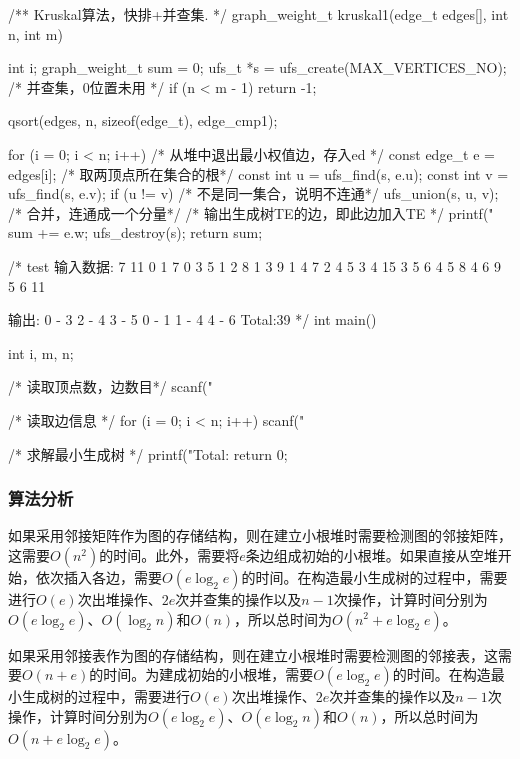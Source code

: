 \begin{Codex}[label=kruskal.c]
/** Kruskal算法，快排+并查集. */
graph_weight_t kruskal1(edge_t edges[], int n, int m) {
    int i;
    graph_weight_t sum = 0;
    ufs_t *s = ufs_create(MAX_VERTICES_NO);  /* 并查集，0位置未用  */
    if (n < m - 1) return -1;

    qsort(edges, n, sizeof(edge_t), edge_cmp1);

    for (i = 0; i < n; i++) {
        /* 从堆中退出最小权值边，存入ed */
        const edge_t e = edges[i];
        /* 取两顶点所在集合的根*/
        const int u = ufs_find(s, e.u);
        const int v = ufs_find(s, e.v);
        if (u != v) { /* 不是同一集合，说明不连通*/
            ufs_union(s, u, v); /* 合并，连通成一个分量*/
            /* 输出生成树TE的边，即此边加入TE */
            printf("%
            sum += e.w;
        }
    }
    ufs_destroy(s);
    return sum;
}

/* test
输入数据:
7 11
0 1 7
0 3 5
1 2 8
1 3 9
1 4 7
2 4 5
3 4 15
3 5 6
4 5 8
4 6 9
5 6 11

输出:
0 - 3
2 - 4
3 - 5
0 - 1
1 - 4
4 - 6
Total:39
*/
int main() {
    int i, m, n;

    /* 读取顶点数，边数目*/
    scanf("%

    /* 读取边信息 */
    for (i = 0; i < n; i++) {
        scanf("%
    }

    /* 求解最小生成树 */
    printf("Total:%
    return 0;
}
\end{Codex}

\subsubsection{算法分析}
如果采用邻接矩阵作为图的存储结构，则在建立小根堆时需要检测图的邻接矩阵，这需要$O(n^2)$的时间。此外，需要将$e$条边组成初始的小根堆。如果直接从空堆开始，依次插入各边，需要$O(e\log_2e)$的时间。在构造最小生成树的过程中，需要进行$O(e)$次出堆操作、$2e$次并查集的操作以及$n-1$次操作，计算时间分别为$O(e\log_2e)$、$O(\log_2n)$和$O(n)$，所以总时间为$O(n^2+e\log_2e)$。

如果采用邻接表作为图的存储结构，则在建立小根堆时需要检测图的邻接表，这需要$O(n+e)$的时间。为建成初始的小根堆，需要$O(e\log_2e)$的时间。在构造最小生成树的过程中，需要进行$O(e)$次出堆操作、$2e$次并查集的操作以及$n-1$次操作，计算时间分别为$O(e\log_2e)$、$O(e\log_2n)$和$O(n)$，所以总时间为$O(n+e\log_2e)$。


